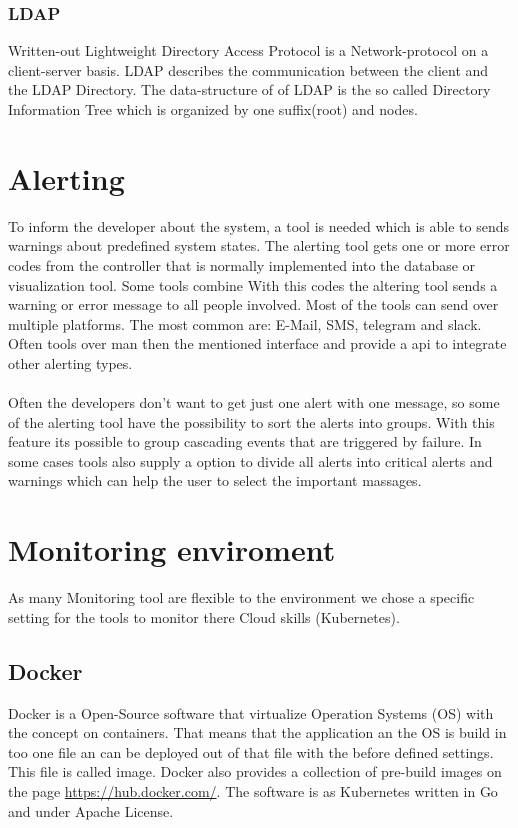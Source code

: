 \subsubsection{LDAP}
Written-out Lightweight Directory Access Protocol is a Network-protocol on a client-server basis. LDAP describes the communication between the client and the LDAP Directory. The data-structure of of LDAP is the so called Directory Information Tree which is organized by one suffix(root) and nodes.  
 


\section{Alerting}
To inform the developer about the system, a tool is needed which is able to sends warnings about predefined system states.
The alerting tool gets one or more error codes from the controller that is normally implemented into the database or visualization tool. Some tools combine With this codes the altering tool sends a warning or error message to all people involved. Most of the tools can send over multiple platforms. The most common are: E-Mail, SMS, telegram and slack. Often tools over man then the mentioned interface and provide a api to integrate other alerting types.\\
\\
Often the developers don’t want to get just one alert with one message, so some of the alerting tool have the possibility to sort the alerts into groups. With this feature its possible to group cascading events that are triggered by failure. In some cases tools also supply a option to divide all alerts into critical alerts and warnings which can help the user to select the important massages.  

\section{Monitoring enviroment}
As many Monitoring tool are flexible to the environment we chose a specific setting for the tools to monitor there Cloud skills (Kubernetes). 
\subsection{Docker}
Docker is a Open-Source software that virtualize Operation Systems (OS) with the concept on containers. That means that the application an the OS is build in too one file an can be deployed out of that file with the before defined settings. This file is called image. Docker also provides a collection of pre-build images on the page \url{https://hub.docker.com/}. The software is as Kubernetes written in Go and under Apache License.

